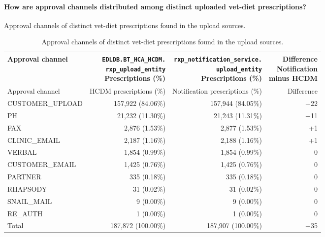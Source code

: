 \paragraph{How are approval channels distributed among distinct uploaded vet-diet prescriptions?}
Approval channels of distinct vet-diet prescriptions found in the upload sources.

\begin{longtable}{@{}lrrr@{}}
\caption{Approval channels of distinct vet-diet prescriptions found in the upload sources.}
\label{tab:upload-vet-diet-approval-channels}\\
\toprule
Approval channel & \shortstack{\texttt{EDLDB.BT\_HCA\_HCDM.}\\\texttt{rxp\_upload\_entity}\\Prescriptions (\%)} & \shortstack{\texttt{rxp\_notification\_service.}\\\texttt{upload\_entity}\\Prescriptions (\%)} & \shortstack{Difference\\Notification\\minus HCDM} \\
\midrule
\endfirsthead
\toprule Approval channel & HCDM prescriptions (\%) & Notification prescriptions (\%) & Difference \\
\midrule
\endhead

{CUSTOMER\_UPLOAD} & 157,922 (84.06\%) & 157,944 (84.05\%) & +22 \\

{PH} & 21,232 (11.30\%) & 21,243 (11.31\%) & +11 \\

{FAX} & 2,876 (1.53\%) & 2,877 (1.53\%) & +1 \\

{CLINIC\_EMAIL} & 2,187 (1.16\%) & 2,188 (1.16\%) & +1 \\

{VERBAL} & 1,854 (0.99\%) & 1,854 (0.99\%) & 0 \\

{CUSTOMER\_EMAIL} & 1,425 (0.76\%) & 1,425 (0.76\%) & 0 \\

{PARTNER} & 335 (0.18\%) & 335 (0.18\%) & 0 \\

{RHAPSODY} & 31 (0.02\%) & 31 (0.02\%) & 0 \\

{SNAIL\_MAIL} & 9 (0.00\%) & 9 (0.00\%) & 0 \\

{RE\_AUTH} & 1 (0.00\%) & 1 (0.00\%) & 0 \\
\midrule
{Total} & 187,872 (100.00\%) & 187,907 (100.00\%) & +35 \\
\bottomrule
\end{longtable}
